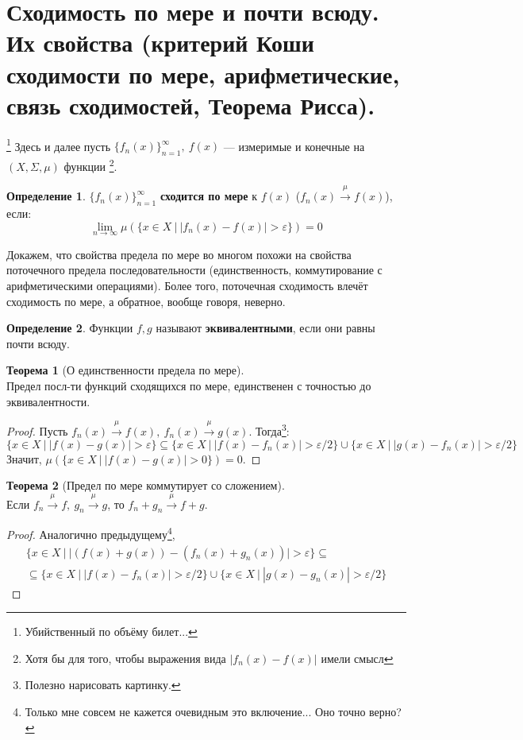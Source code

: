 \documentclass[11pt,a4paper]{report}
\def\eps{\varepsilon}
\theoremstyle{definition}
\theoremstyle{definition}
\newtheorem{theorem}{Теорема}[section]
\theoremstyle{definition}
\newtheorem{definition}{Определение}[section]
\begin{document}
	\section{Сходимость по мере и почти всюду. Их свойства (критерий Коши сходимости по мере, арифметические, связь сходимостей, Теорема Рисса).}\footnote{Убийственный по объёму билет...}
		Здесь и далее пусть $ \{f_{n}(x)\}_{n=1}^{\infty},\ f(x) $ — измеримые и конечные на $ (X, \Sigma, \mu) $ функции \footnote{Хотя бы для того, чтобы выражения вида $ |f_{n}(x) - f(x)| $ имели смысл}.
		\begin{definition}
			$ \{f_{n}(x)\}_{n=1}^{\infty} $ \textbf{сходится по мере} к $ f(x) $ ($ f_{n}(x) \xrightarrow{\mu} f(x) $), если:\
			\[ \lim\limits_{n\to\infty}{\mu(\{x \in X\ |\ |f_{n}(x) - f(x)| > \eps\})} = 0 \]
		\end{definition}
		\noindent Докажем, что свойства предела по мере во многом похожи на свойства поточечного предела последовательности (единственность, коммутирование с арифметическими операциями). Более того, поточечная сходимость влечёт сходимость по мере, а обратное, вообще говоря, неверно. 
		\begin{definition}
			Функции $ f, g $ называют \textbf{эквивалентными}, если они равны почти всюду.
		\end{definition}
		\begin{theorem}[О единственности предела по мере]$  $\\
			Предел посл-ти функций сходящихся по мере, единственен с точностью до эквивалентности.
		\end{theorem}
		\begin{proof}
			Пусть $ f_{n}(x) \xrightarrow{\mu} f(x),\ f_{n}(x) \xrightarrow{\mu} g(x) $. Тогда\footnote{Полезно нарисовать картинку.}:
			\[ \{x \in X\ |\ |f(x) - g(x)| > \eps \} \subseteq \{x \in X\ |\ |f(x) - f_{n}(x)| >  \eps/2 \} \cup \{x \in X\ |\ |g(x) - f_{n}(x)| > \eps/2 \} \]
			Значит, $ \mu(\{x \in X\ |\ |f(x) - g(x)| > 0 \}) = 0  $.
		\end{proof}
		\begin{theorem}[Предел по мере коммутирует со сложением]$  $\\
			Если $ f_{n} \xrightarrow{\mu} f,\ g_{n} \xrightarrow{\mu} g $, то $ f_{n} + g_{n} \xrightarrow{\mu} f + g $.
		\end{theorem}
		\begin{proof}
			Аналогично предыдущему\footnote{Только мне совсем не кажется очевидным это включение... Оно точно верно?},
			\begin{gather*} 
				\{x \in X\ |\ |(f(x) + g(x)) - (f_{n}(x) + g_{n}(x))| > \eps \} \subseteq\\\subseteq \{x \in X\ |\ |f(x) - f_{n}(x)| >  \eps/2 \} \cup \{x \in X\ |\ |g(x) - g_{n}(x)| > \eps/2 \}
			\end{gather*}
		\end{proof}
\end{document}
